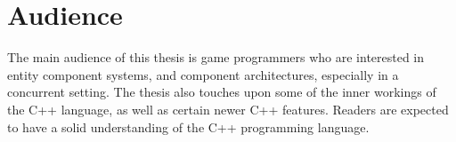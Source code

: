 \section{Audience}
The main audience of this thesis is game programmers who are interested in entity component systems,
and component architectures, especially in a concurrent setting.
The thesis also touches upon some of the inner workings of the C++ language, as well as certain newer C++ features.
Readers are expected to have a solid understanding of the C++ programming language.
